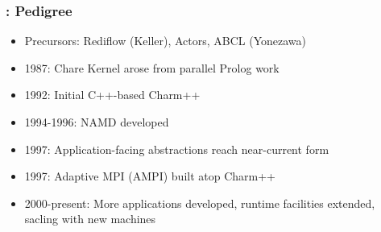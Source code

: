 \begin{frame}
\frametitle{\charm: Pedigree}
\begin{itemize}
\item Precursors: Rediflow (Keller), Actors, ABCL (Yonezawa)
\item 1987: Chare Kernel arose from parallel Prolog work
\item 1992: Initial C++-based Charm++
\item 1994-1996: NAMD developed
\item 1997: Application-facing abstractions reach near-current form
\item 1997: Adaptive MPI (AMPI) built atop Charm++
\item 2000-present: More applications developed, runtime facilities extended,
  sacling with new machines
\end{itemize}
\end{frame}
